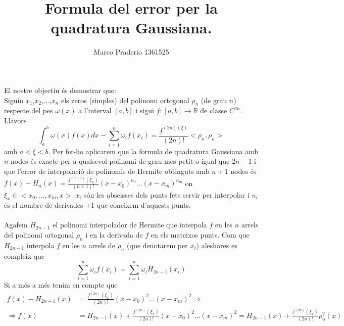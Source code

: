\documentclass[a4paper,10pt]{article}
\title{Formula del error per la quadratura Gaussiana.}
\author{Marco Praderio 1361525}
\date{}
\renewcommand{\*}{\cdot}
\renewcommand{\phi}{\rho}
\newcommand{\R}{\mathbb{R}}
\begin{document}
\maketitle
El nostre objectiu és demostrar que:\\
Siguin $x_1$,$x_2$,$\dots$,$x_n$ els zeros (simples) del polinomi ortogonal $\phi_n$ (de grau $n$) respecte del pes $\omega(x)$ a l'interval $[a,b]$ i sigui $f:[a,b]\to\R$ de
classe $C^{2n}$. Llavors
\begin{equation*}
 \int_a^b\omega(x)f(x)dx-\sum_{i=1}^n\omega_if(x_i)=\frac{f^{(2n)(\xi)}}{(2n)!}<\phi_n,\phi_n>
\end{equation*}
amb $a<\xi<b$.
Per fer-ho aplicarem que la formula de quadratura Gaussiana amb $n$ nodes és exacte per a qualsevol polinomi de grau mes petit o igual que $2n-1$ i que l'error de
interpolació de polinomis de Hermite obtinguts amb $n+1$ nodes és $f(x)-H_n(x)=\frac{f^{(n+1)}(\xi_x)}{(n+1)!}(x-x_0)^{n_0}\dots(x-x_m)^{n_m}$ on $\xi_x\in<x_0,\dots,x_m,x>$
$x_i$ són les abscisses dels punts fets servir per interpolar i $n_i$ és el nombre de derivades +1 que coneixem d'aquests punts.
\paragraph*{}
Agafem $H_{2n-1}$ el polinomi interpolador de Hermite que interpola $f$ en les $n$ arrels del polinomi ortogonal $\phi_n$ i en la derivada de $f$ en els mateixos punts.
Com que $H_{2n-1}$ interpola $f$ en les $n$ arrels de $\phi_n$ (que denotarem per $x_i$) aleshores es compleix que
$$\sum_{i=1}^n\omega_if(x_i)=\sum_{i=1}^n\omega_iH_{2n-1}(x_i)$$
Si a més a més tenim en compte que
\begin{equation*}
 \begin{split}
  f(x)-H_{2n-1}(x)&=\frac{f^{(2n)}(\xi_x)}{(2n)!}(x-x_0)^2\dots(x-x_m)^2 \Rightarrow \\
  \Rightarrow f(x)&=H_{2n-1}(x)+\frac{f^{(2n)}(\xi_x)}{(2n)!}(x-x_0)^2\dots(x-x_m)^2=
H_{2n-1}(x)+\frac{f^{(2n)}(\xi_x)}{(2n)!}\phi_n^2(x)
 \end{split}
\end{equation*}
\end{document}
